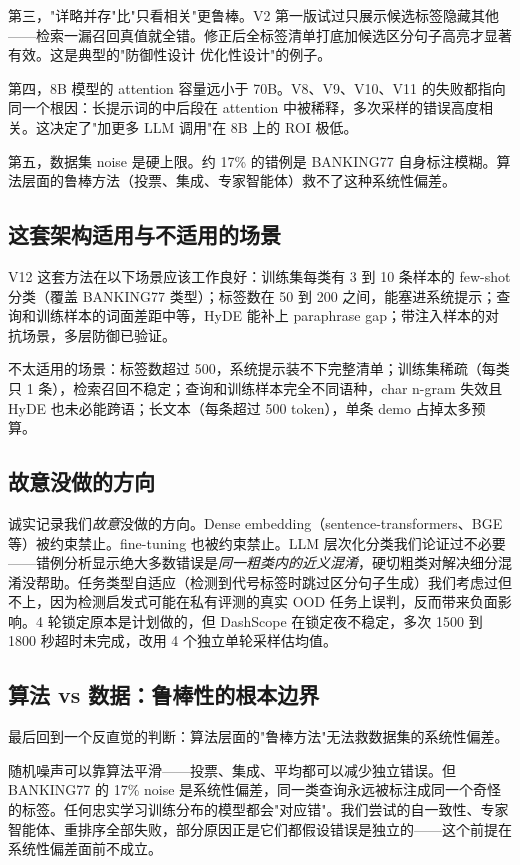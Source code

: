 \documentclass[11pt,a4paper]{article}
\begin{document}
第三，"详略并存"比"只看相关"更鲁棒。V2 第一版试过只展示候选标签隐藏其他——检索一漏召回真值就全错。修正后全标签清单打底加候选区分句子高亮才显著有效。这是典型的"防御性设计 \> 优化性设计"的例子。

第四，8B 模型的 attention 容量远小于 70B。V8、V9、V10、V11 的失败都指向同一个根因：长提示词的中后段在 attention 中被稀释，多次采样的错误高度相关。这决定了"加更多 LLM 调用"在 8B 上的 ROI 极低。

第五，数据集 noise 是硬上限。约 17\% 的错例是 BANKING77 自身标注模糊。算法层面的鲁棒方法（投票、集成、专家智能体）救不了这种系统性偏差。

\subsection{这套架构适用与不适用的场景}

V12 这套方法在以下场景应该工作良好：训练集每类有 3 到 10 条样本的 few-shot 分类（覆盖 BANKING77 类型）；标签数在 50 到 200 之间，能塞进系统提示；查询和训练样本的词面差距中等，HyDE 能补上 paraphrase gap；带注入样本的对抗场景，多层防御已验证。

不太适用的场景：标签数超过 500，系统提示装不下完整清单；训练集稀疏（每类只 1 条），检索召回不稳定；查询和训练样本完全不同语种，char n-gram 失效且 HyDE 也未必能跨语；长文本（每条超过 500 token），单条 demo 占掉太多预算。

\subsection{故意没做的方向}

诚实记录我们\emph{故意}没做的方向。Dense embedding（sentence-transformers、BGE 等）被约束禁止。fine-tuning 也被约束禁止。LLM 层次化分类我们论证过不必要——错例分析显示绝大多数错误是\emph{同一粗类内的近义混淆}，硬切粗类对解决细分混淆没帮助。任务类型自适应（检测到代号标签时跳过区分句子生成）我们考虑过但不上，因为检测启发式可能在私有评测的真实 OOD 任务上误判，反而带来负面影响。4 轮锁定原本是计划做的，但 DashScope 在锁定夜不稳定，多次 1500 到 1800 秒超时未完成，改用 4 个独立单轮采样估均值。

\subsection{算法 vs 数据：鲁棒性的根本边界}

最后回到一个反直觉的判断：算法层面的"鲁棒方法"无法救数据集的系统性偏差。

随机噪声可以靠算法平滑——投票、集成、平均都可以减少独立错误。但 BANKING77 的 17\% noise 是系统性偏差，同一类查询永远被标注成同一个奇怪的标签。任何忠实学习训练分布的模型都会"对应错"。我们尝试的自一致性、专家智能体、重排序全部失败，部分原因正是它们都假设错误是独立的——这个前提在系统性偏差面前不成立。
\end{document}
